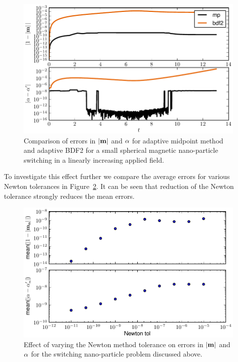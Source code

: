 \begin{figure}[ht!]
  \centering
  \includegraphics{images/linear_field_switch_errors}
  \caption{Comparison of errors in $\lvert \mathbf{m} \rvert$ and $\alpha$ for adaptive midpoint method and adaptive BDF2 for a small spherical magnetic nano-particle switching in a linearly increasing applied field.}
  \label{fig:linear-field-switch-errors-mp}
\end{figure}


To investigate this effect further we compare the average errors for various Newton tolerances in Figure~\ref{fig:newton-tol-errors-mp}.
It can be seen that reduction of the Newton tolerance strongly reduces the mean errors.

\begin{figure}[ht!]
  \centering
  \includegraphics{images/midpoint_newton_tol_errors}
  \caption{Effect of varying the Newton method tolerance on errors in $\lvert \mathbf{m} \rvert$ and $\alpha$  for the switching nano-particle problem discussed above.}
  \label{fig:newton-tol-errors-mp}
\end{figure}

